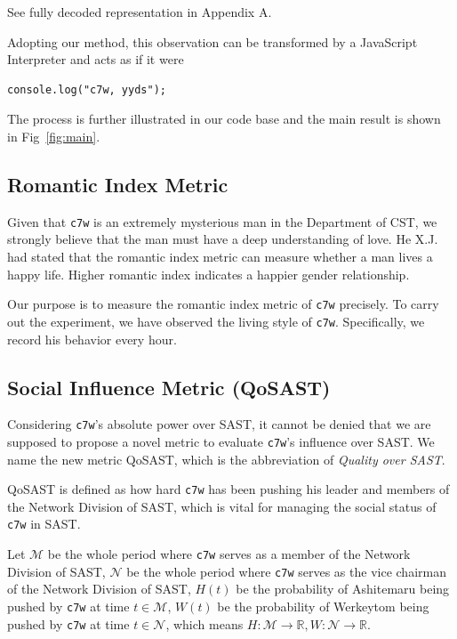 \documentclass[10pt,twocolumn,letterpaper]{article}
\begin{document}
See fully decoded representation in Appendix A.

Adopting our method, this observation can be transformed by a JavaScript Interpreter and acts as if it were

\begin{lstlisting}[caption=Result of the Observation]
console.log("c7w, yyds");
\end{lstlisting}

The process is further illustrated in our code base and the main result is shown in Fig~\ref{fig:main}.

\subsection{Romantic Index Metric}

Given that \verb|c7w| is an extremely mysterious man in the Department of CST, we strongly believe that the man must have a deep understanding of love. He X.J. had stated that the romantic index metric can measure whether a man lives a happy life. Higher romantic index indicates a happier gender relationship.

Our purpose is to measure the romantic index metric of \verb|c7w| precisely. To carry out the experiment, we have observed the living style of \verb|c7w|. Specifically, we record his behavior every hour.

\subsection{Social Influence Metric (QoSAST)}

Considering \verb|c7w|'s absolute power over SAST, it cannot be denied that we are supposed to propose a novel metric to evaluate \verb|c7w|'s influence over SAST. We name the new metric QoSAST, which is the abbreviation of \emph{Quality over SAST}.

QoSAST is defined as how hard \verb|c7w| has been pushing his leader and members of the Network Division of SAST, which is vital for managing the social status of \verb|c7w| in SAST.

Let $\mathcal{M}$ be the whole period where \verb|c7w| serves as a member of the Network Division of SAST, $\mathcal{N}$ be the whole period where \verb|c7w| serves as the vice chairman of the Network Division of SAST, $H(t)$ be the probability of Ashitemaru being pushed by \verb|c7w| at time $t \in \mathcal{M}$, $W(t)$ be the probability of Werkeytom being pushed by \verb|c7w| at time $t \in \mathcal{N}$, which means $H: \mathcal{M} \to \mathbb{R}, W: \mathcal{N} \to \mathbb{R}$.
\end{document}
